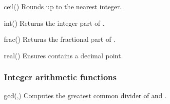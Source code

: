 \begin{math-function}{ceil()}
\mathcommand
    Rounds  up to the nearest integer.
\begin{codeexample}[]
 \pgfmathresult
\end{codeexample}

\begin{codeexample}[]
 \pgfmathresult
\end{codeexample}

\begin{codeexample}[]
 \pgfmathresult
\end{codeexample}
\end{math-function}

\begin{math-function}{int()}
\mathcommand
    Returns the integer part of .
\begin{codeexample}[]
 \pgfmathresult
\end{codeexample}
\end{math-function}

\begin{math-function}{frac()}
\mathcommand
    Returns the fractional part of .
\begin{codeexample}[]
 \pgfmathresult
\end{codeexample}
\end{math-function}

\begin{math-function}{real()}
\mathcommand
    Ensures  contains a decimal point.
\begin{codeexample}[]
 \pgfmathresult
\end{codeexample}
\end{math-function}


\subsubsection{Integer arithmetic functions}
\label{pgfmath-functions-integerarithmetic}

\begin{math-function}{gcd(,)}
\mathcommand
    Computes the greatest common divider of  and .
\begin{codeexample}[]
 \pgfmathresult
\end{codeexample}
\end{math-function}

